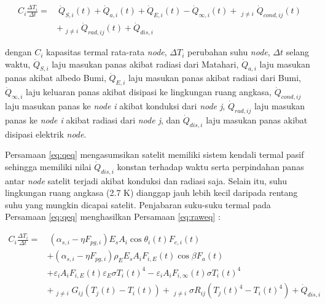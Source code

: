 \begin{equation}
\label{eq:qeq}
\begin{split}
	C_{i} \frac{\Delta T_i}{\Delta t} = &\ \dot{Q}_{S,i}(t) + \dot{Q}_{a,i}(t) + \dot{Q}_{E,i}(t) - \dot{Q}_{\infty,i}(t) + \mathop{\sum_{j=1}^{N}}_{j \neq i} \dot{Q}_{cond,ij}(t) \\
	&+ \mathop{\sum_{j=1}^{N}}_{j \neq i} \dot{Q}_{rad,ij}(t) + \dot{Q}_{dis,i}
\end{split}
\end{equation}

dengan $C_i$ kapasitas termal rata-rata \textit{node}, $\Delta T_i$ perubahan
suhu \textit{node}, $\Delta t$ selang waktu, $\dot{Q}_{S,i}$ laju masukan panas
akibat radiasi dari Matahari, $\dot{Q}_{a,i}$ laju masukan panas akibat albedo
Bumi, $\dot{Q}_{E,i}$ laju masukan panas akibat radiasi dari Bumi,
$\dot{Q}_{\infty,i}$ laju keluaran panas akibat disipasi ke lingkungan ruang
angkasa, $\dot{Q}_{cond,ij}$ laju masukan panas ke \textit{node i} akibat
konduksi dari \textit{node j}, $\dot{Q}_{rad,ij}$ laju masukan panas ke
\textit{node i} akibat radiasi dari \textit{node j}, dan  $\dot{Q}_{dis,i}$
laju masukan panas akibat disipasi elektrik \textit{node}.

Persamaan \ref{eq:qeq} mengasumsikan satelit memiliki sistem kendali termal
pasif sehingga memiliki nilai $\dot{Q}_{dis,i}$ konstan terhadap waktu serta
perpindahan panas antar \textit{node} satelit terjadi akibat konduksi dan
radiasi saja. Selain itu, suhu lingkungan ruang angkasa (2.7 K) dianggap jauh
lebih kecil daripada rentang suhu yang mungkin dicapai satelit. Penjabaran
suku-suku termal pada Persamaan \ref{eq:qeq} menghasilkan Persamaan
\ref{eq:raweq} :

\begin{equation}
\label{eq:raweq}
\begin{split}
	C_{i} \frac{\Delta T_i}{\Delta t} = &\ \left(\alpha_{s,i} - \eta F_{pg,i}\right) E_s A_i \cos{\theta_{i}(t)} F_{e,i}(t) \\
	&+ \left(\alpha_{s,i} - \eta F_{pg,i}\right)\rho_{E} E_s A_i F_{i,E}(t) \cos{\beta} F_a(t) \\
	&+ \varepsilon_i A_i F_{i,E}(t) \varepsilon_E \sigma T_{i}(t)^4 - \varepsilon_i A_i F_{i,\infty}(t) \sigma T_{i}(t)^4 \\
	&+ \mathop{\sum_{j=1}^{N}}_{j \neq i} G_{ij} \left(T_j(t) - T_i(t)\right) + \mathop{\sum_{j=1}^{N}}_{j \neq i} \sigma R_{ij}(T_{j}(t)^4-T_{i}(t)^4) + \dot{Q}_{dis,i}
\end{split}
\end{equation}

